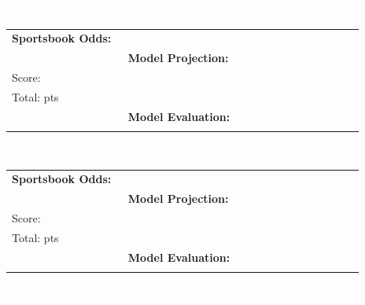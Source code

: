 \documentclass[10pt,a4paper]{article}
\begin{document}
\vspace{8pt}

\noindent\colorbox{matchupbar}{\parbox{\dimexpr\linewidth-2\fboxsep}{%
  \vspace{3pt}\hspace{4pt}{\bfseries\large\textcolor{white}{Los Angeles Lakers @ New York Knicks}}
  \hfill{\small\textcolor{white}{Pace:  poss/team}}\vspace{3pt}
}}
\vspace{4pt}

\begin{tabular}{@{}p{0.32\linewidth}p{0.32\linewidth}p{0.33\linewidth}@{}}
\small
\textbf{Sportsbook Odds:} \\
&
\textbf{Model Projection:} \\
Score: \textbf{}\\
Total: \textbf{} pts\\
&
\textbf{Model Evaluation:} \\
\\
\end{tabular}

\vspace{8pt}

\noindent\colorbox{matchupbar}{\parbox{\dimexpr\linewidth-2\fboxsep}{%
  \vspace{3pt}\hspace{4pt}{\bfseries\large\textcolor{white}{Orlando Magic @ San Antonio Spurs}}
  \hfill{\small\textcolor{white}{Pace:  poss/team}}\vspace{3pt}
}}
\vspace{4pt}

\begin{tabular}{@{}p{0.32\linewidth}p{0.32\linewidth}p{0.33\linewidth}@{}}
\small
\textbf{Sportsbook Odds:} \\
&
\textbf{Model Projection:} \\
Score: \textbf{}\\
Total: \textbf{} pts\\
&
\textbf{Model Evaluation:} \\
\\
\end{tabular}

\vspace{8pt}

\noindent\colorbox{matchupbar}{\parbox{\dimexpr\linewidth-2\fboxsep}{%
  \vspace{3pt}\hspace{4pt}{\bfseries\large\textcolor{white}{Milwaukee Bucks @ Boston Celtics}}
  \hfill{\small\textcolor{white}{Pace:  poss/team}}\vspace{3pt}
}}
\vspace{4pt}
\end{document}

